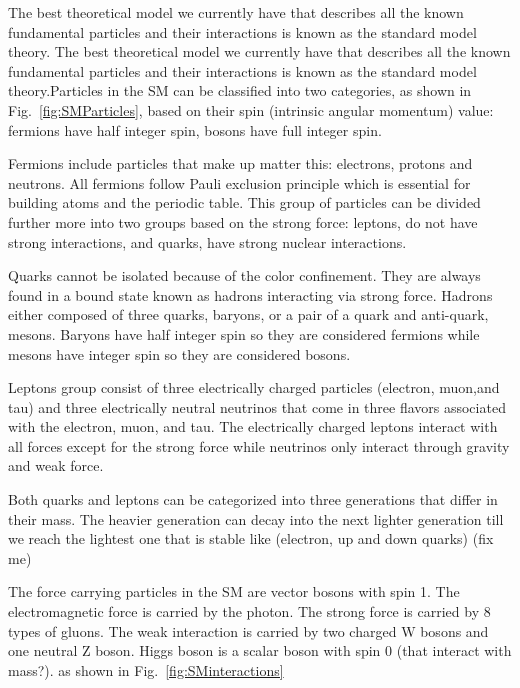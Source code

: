 
The best theoretical model we currently have that describes all the known fundamental particles and their interactions is known as the standard model theory. 
The best theoretical model we currently have that describes all the known fundamental particles and their interactions is known as the standard model theory.Particles in the SM can be classified into two categories, as shown in Fig.~\ref{fig:SMParticles}, based on their spin (intrinsic angular momentum) value: fermions have half integer spin, bosons have full integer spin.

Fermions include particles that make up matter this: electrons, protons and neutrons. All fermions follow Pauli exclusion principle which is essential for building atoms and the periodic table. This group of particles can be divided further more into two groups based on the strong force: leptons, do not have strong interactions, and quarks, have strong nuclear interactions.

Quarks cannot be isolated because of the color confinement. They are always found in a bound state known as hadrons interacting via strong force. Hadrons either composed of three quarks, baryons, or a pair of a quark and anti-quark, mesons. Baryons have half integer spin so they are considered fermions while mesons have integer spin so they are considered bosons.

Leptons group consist of three electrically charged particles (electron, muon,and tau) and three electrically neutral neutrinos that come in three flavors associated with the electron, muon, and tau. The electrically charged leptons interact with all forces except for the strong force while neutrinos only interact through gravity and weak force.

Both quarks and leptons can be categorized into
three generations that differ in their mass.
The heavier generation can decay into the next lighter generation till we reach the lightest one that is stable like (electron, up and  down quarks) (fix me) %

The force carrying particles in the SM are vector bosons with spin 1. The electromagnetic force is carried by the photon. The strong force is carried by 8 types of gluons. The weak interaction is carried by two charged W bosons and one neutral Z boson. Higgs boson is a scalar boson with spin 0 (that interact with mass?). as shown in Fig.~\ref{fig:SMinteractions}

